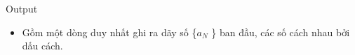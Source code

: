Output  
\begin{itemize}
	\item     Gồm một dòng duy nhất ghi ra dãy số \{$a_{N}$    \} ban đầu, các số cách nhau bởi dấu cách.   
\end{itemize}
